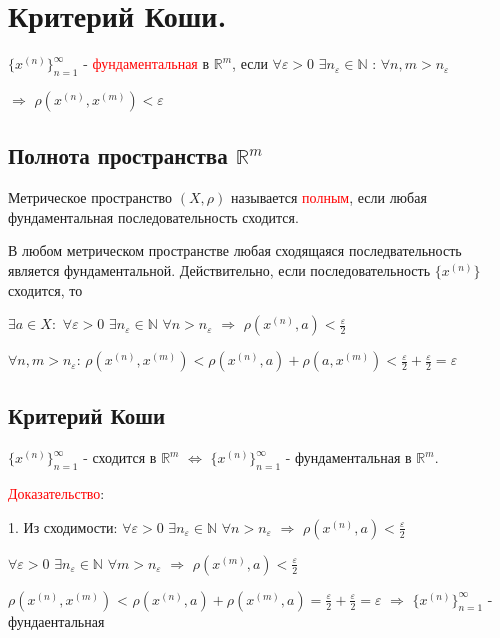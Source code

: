 \section{Критерий Коши.}

$\{x^{(n)}\}_{n=1}^{\infty}$ - \textcolor{red} {фундаментальная} в $\mathbb {R}^m$, если $\forall \varepsilon > 0$ $\exists n_\varepsilon \in \mathbb {N}$ : $\forall n, m > n_\varepsilon$

$\Rightarrow$ $\rho (x^{(n)}, x^{(m)})  < \varepsilon$

\subsection{Полнота пространства $\mathbb {R}^m$ }
Метрическое пространство ${(X, \rho)}$ называется \textcolor{red}{полным}, если любая фундаментальная последовательность сходится. 

В любом метрическом пространстве любая сходящаяся последвательность является фундаментальной. Действительно, если последовательность $\{x^{(n)}\}$ сходится, то 

$\exists a \in X:$ $\forall \varepsilon > 0$ $ \exists n_\varepsilon \in \mathbb {N}$ $\forall n > n_\varepsilon $ $\Rightarrow$ $\rho(x^{(n)}, a) < \frac{\varepsilon}{2}$

$\forall n, m > n_\varepsilon$: $\rho(x^{(n)}, x^{(m)}) < \rho(x^{(n)}, a) + \rho(a, x^{(m)}) < \frac{\varepsilon}{2} + \frac{\varepsilon}{2} = \varepsilon$

\subsection{Критерий Коши} 
$\{x^{(n)}\}_{n=1}^{\infty}$ - сходится в $\mathbb {R}^m$ $\Leftrightarrow$ $\{x^{(n)}\}_{n=1}^{\infty}$ - фундаментальная в $\mathbb {R}^m$.

\textcolor{red}{Доказательство}:

1. Из сходимости: $\forall \varepsilon > 0$ $ \exists n_\varepsilon \in \mathbb {N}$ $\forall n > n_\varepsilon $ $\Rightarrow$ $\rho(x^{(n)}, a) < \frac{\varepsilon}{2}$

$\forall \varepsilon > 0$ $\exists n_\varepsilon \in \mathbb {N}$ $\forall m > n_\varepsilon $ $\Rightarrow$ $\rho(x^{(m)}, a) < \frac{\varepsilon}{2}$


$\rho(x^{(n)}, x^{(m)})$ < $\rho(x^{(n)}, a) + \rho(x^{(m)}, a) = \frac{\varepsilon}{2} + \frac{\varepsilon}{2} = \varepsilon$ $\Rightarrow$
$\{x^{(n)}\}_{n=1}^{\infty}$ - фундаентальная

